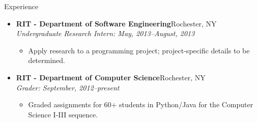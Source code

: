 \documentclass[11pt,oneside]{article}
\newenvironment{ressection}[1]{
	\vspace{1pt}
	{\fontfamily{phv}\selectfont\Large#1}
	\begin{itemize}
	\vspace{-2pt}
}{
	\end{itemize}
}
\newcommand{\resitem}[1]{
	\vspace{-4pt}
	\item \begin{flushleft} #1 \end{flushleft}
}
\newcommand{\ressubitem}[1]{
	\vspace{-5pt}
	\item \begin{flushleft} #1 \end{flushleft}
}
\newcommand{\resbigitem}[3]{
	\vspace{-5pt}
	\item
	\textbf{#1}\hfill#2 \\
	\textit{#3}
}
\newenvironment{ressubsec}[3]{
	\resbigitem{#1}{#2}{#3}
	\vspace{-5pt}
	\begin{itemize}
}{
	\end{itemize}
}
\begin{document}

\begin{ressection}{Experience}


	\begin{ressubsec}{RIT - Department of Software Engineering}{Rochester, NY}{Undergraduate Research Intern: May, 2013--August, 2013}
		\ressubitem{Apply research to a programming project; project-specific details to be determined.}
	\end{ressubsec}

	\begin{ressubsec}{RIT - Department of Computer Science}{Rochester, NY}
{Grader: September, 2012--present}
		\ressubitem{Graded assignments for 60+ students in Python/Java for the  Computer Science I-III sequence.}
	\end{ressubsec}




\end{ressection}
\end{document}
